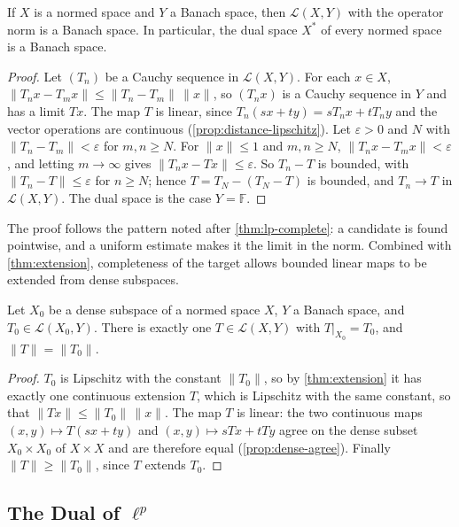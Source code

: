 \begin{theorem}
\label{thm:operator-space-complete}
If $X$ is a normed space and $Y$ a Banach space, then $\mathcal L(X,Y)$ with the operator norm is a Banach space. In particular, the dual space $X^*$ of every normed space is a Banach space.
\end{theorem}

\begin{proof}
Let $(T_n)$ be a Cauchy sequence in $\mathcal L(X,Y)$. For each $x\in X$, $\|T_nx-T_mx\|\le\|T_n-T_m\|\,\|x\|$, so $(T_nx)$ is a Cauchy sequence in $Y$ and has a limit $Tx$. The map $T$ is linear, since $T_n(sx+ty)=sT_nx+tT_ny$ and the vector operations are continuous (\cref{prop:distance-lipschitz}). Let $\varepsilon>0$ and $N$ with $\|T_n-T_m\|<\varepsilon$ for $m,n\ge N$. For $\|x\|\le1$ and $m,n\ge N$, $\|T_nx-T_mx\|<\varepsilon$, and letting $m\to\infty$ gives $\|T_nx-Tx\|\le\varepsilon$. So $T_n-T$ is bounded, with $\|T_n-T\|\le\varepsilon$ for $n\ge N$; hence $T=T_N-(T_N-T)$ is bounded, and $T_n\to T$ in $\mathcal L(X,Y)$. The dual space is the case $Y=\mathbb F$.
\end{proof}

The proof follows the pattern noted after \cref{thm:lp-complete}: a candidate is found pointwise, and a uniform estimate makes it the limit in the norm. Combined with \cref{thm:extension}, completeness of the target allows bounded linear maps to be extended from dense subspaces.

\begin{corollary}
\label{cor:bounded-extension}
Let $X_0$ be a dense subspace of a normed space $X$, $Y$ a Banach space, and $T_0\in\mathcal L(X_0,Y)$. There is exactly one $T\in\mathcal L(X,Y)$ with $T|_{X_0}=T_0$, and $\|T\|=\|T_0\|$.
\end{corollary}

\begin{proof}
$T_0$ is Lipschitz with the constant $\|T_0\|$, so by \cref{thm:extension} it has exactly one continuous extension $T$, which is Lipschitz with the same constant, so that $\|Tx\|\le\|T_0\|\,\|x\|$. The map $T$ is linear: the two continuous maps $(x,y)\mapsto T(sx+ty)$ and $(x,y)\mapsto sTx+tTy$ agree on the dense subset $X_0\times X_0$ of $X\times X$ and are therefore equal (\cref{prop:dense-agree}). Finally $\|T\|\ge\|T_0\|$, since $T$ extends $T_0$.
\end{proof}

\subsection{The Dual of \texorpdfstring{$\ell^p$}{lp}}

